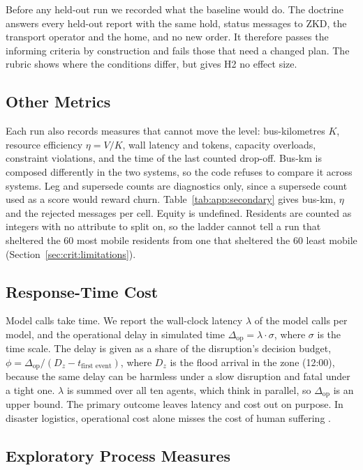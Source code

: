 Before any held-out run we recorded what the baseline would do. The doctrine
answers every held-out report with the same hold, status messages to ZKD, the
transport operator and the home, and no new order. It therefore passes the
informing criteria by construction and fails those that need a changed plan.
The rubric shows where the conditions differ, but gives H2 no effect size.

\subsection{Other Metrics}
\label{sec:eval:metrics}

Each run also records measures that cannot move the level: bus-kilometres $K$,
resource efficiency $\eta = V / K$, wall latency and tokens, capacity
overloads, constraint violations, and the time of the last counted drop-off.
Bus-km is composed differently in the two
systems, so the code refuses to compare it across systems. Leg and supersede
counts are diagnostics only, since a supersede count used as a score would
reward churn. Table~\ref{tab:app:secondary} gives bus-km, $\eta$ and the
rejected messages per cell. Equity is undefined. Residents are counted as integers with no
attribute to split on, so the ladder cannot tell a run that sheltered the 60
most mobile residents from one that sheltered the 60 least mobile
(Section~\ref{sec:crit:limitations}).

\subsection{Response-Time Cost}
\label{sec:eval:responsetime}

Model calls take time. We report the wall-clock latency $\lambda$ of the model
calls per model, and the operational delay in simulated time
$\Delta_{\text{op}} = \lambda \cdot \sigma$, where $\sigma$ is the time scale.
The delay is given as a share of the disruption's decision budget,
$\phi = \Delta_{\text{op}} / (D_z - t_{\text{first event}})$, where $D_z$ is
the flood arrival in the zone (12:00), because the same
delay can be harmless under a slow disruption and fatal under a tight one.
$\lambda$ is summed over all ten agents, which think in parallel, so
$\Delta_{\text{op}}$ is an upper bound. The primary outcome leaves latency and
cost out on purpose. In disaster logistics, operational cost alone misses the
cost of human suffering \parencite{holguin-veras2013}.

\subsection{Exploratory Process Measures}
\label{sec:eval:v2}

